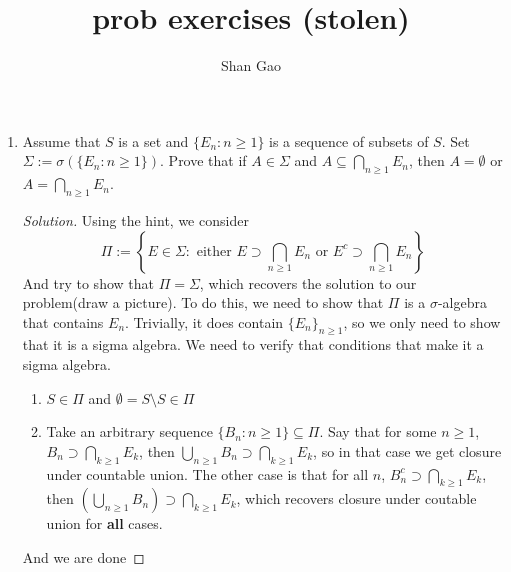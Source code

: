 \documentclass[12pt]{article}
\title{prob exercises (stolen)}
\author{Shan Gao}
\begin{document}
\maketitle

\begin{enumerate}
	\item Assume that $S$ is a set and $\{E_n \colon n \geq 1\}$ is a sequence of subsets of $S$. Set $\Sigma:= \sigma(\{E_n \colon n \geq 1\})$. Prove that if $A \in \Sigma$ and $A \subseteq \bigcap_{n \geq 1} E_n$, then $A = \emptyset$ or $A = \bigcap_{n \geq 1} E_n$. 
		\begin{proof}[Solution]
			Using the hint, we consider
			$$
			\Pi := \left\{E \in \Sigma \colon \text{ either } E \supset \bigcap_{n \geq 1} E_n \text{ or } E^c \supset \bigcap_{n \geq 1} E_n \right\}
			$$
			And try to show that $\Pi = \Sigma$, which recovers the solution to our problem(draw a picture). To do this, we need to show that $\Pi$ is a $\sigma$-algebra that contains $E_n$. Trivially, it does contain $\{E_n\}_{n \geq 1}$, so we only need to show that it is a sigma algebra. We need to verify that conditions that make it a sigma algebra.  
			\begin{enumerate}
				\item $S \in \Pi$ and $\emptyset = S\setminus S \in \Pi$ 
				\item Take an arbitrary sequence $\{B_n\colon n \geq 1\} \subseteq \Pi$. Say that for some $n \geq 1$, $B_n \supset \bigcap_{k \geq 1} E_k$, then $\bigcup_{n \geq 1}B_n \supset \bigcap_{k \geq 1} E_k$, so in that case we get closure under countable union. The other case is that for all $n$, $B_n^c \supset \bigcap_{k \geq 1} E_k$, then $\left(\bigcup_{n \geq 1} B_n \right) \supset \bigcap_{k \geq 1} E_k$, which recovers closure under coutable union for \textbf{all} cases.  
			\end{enumerate}
And we are done




\end{proof}
\end{enumerate}
\end{document}
